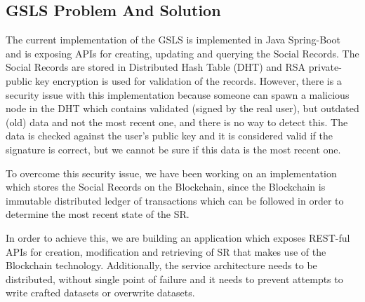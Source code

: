 \subsection{GSLS Problem And Solution}
The current implementation of the GSLS is implemented in Java Spring-Boot and is exposing APIs for creating, updating and  querying the Social Records. The Social Records are stored in  Distributed Hash Table (DHT) and RSA private-public key encryption is used for validation of the records. However, there is a security issue with this implementation because someone can spawn a malicious node in the DHT which contains validated (signed by the real user), but outdated (old) data and not the most recent one, and there is no way to detect this. The data is checked against the user’s public key and it is considered valid if the signature is correct, but we cannot be sure if this data is the most recent one.

To overcome this security issue, we have been working on an implementation which stores the Social Records on the Blockchain, since the Blockchain is immutable distributed ledger of transactions which can be followed in order to determine the most recent state of the SR.

In order to achieve this, we are building an application which exposes REST-ful APIs for creation, modification and retrieving of SR that makes use of the Blockchain technology. Additionally, the service architecture needs to be distributed, without single point of failure and it needs to prevent attempts to write crafted datasets or overwrite datasets.
